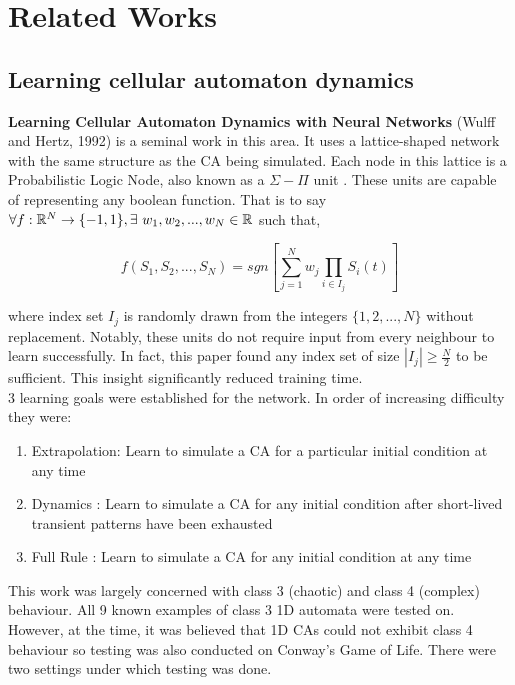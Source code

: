 \chapter{Related Works}

\section{Learning cellular automaton dynamics}

\noindent
\textbf{Learning Cellular Automaton Dynamics with Neural Networks} (Wulff and Hertz, 1992) \cite{wulff1992learning} is a seminal work in this area.
It uses a lattice-shaped network with the same structure as the CA being simulated.
Each node in this lattice is a Probabilistic Logic Node, also known as a $\Sigma-\Pi$ unit \cite{gurney1992training}.
These units are capable of representing any boolean function.
That is to say $ \forall f: \mathbb{R}^N \to \{-1, 1\}, \exists~w_1, w_2, ... , w_N \in \mathbb{R} $ such that,

\begin{equation} \label{eq:sigma_pi}
f(S_1, S_2, ..., S_N) = sgn\left[ \sum_{j=1}^{N} w_j \prod_{i \in I_j} S_i(t) \right]
\end{equation}

\noindent
where index set $I_j$ is randomly drawn from the integers $\{1, 2, ..., N\}$ without replacement.
Notably, these units do not require input from every neighbour to learn successfully.
In fact, this paper found any index set of size $|I_j| \geq \frac{N}{2}$ to be sufficient.
This insight significantly reduced training time. \\ 
3 learning goals were established for the network.
In order of increasing difficulty they were:

\begin{enumerate}
  \item Extrapolation: Learn to simulate a CA for a particular initial condition at any time
  \item Dynamics : Learn to simulate a CA for any initial condition after short-lived transient patterns have been exhausted
  \item Full Rule : Learn to simulate a CA for any initial condition at any time
\end{enumerate}

This work was largely concerned with class 3 (chaotic) and class 4 (complex) behaviour. 
All 9 known examples of class 3 1D automata were tested on.
However, at the time, it was believed that 1D CAs could not exhibit class 4 behaviour so testing was also conducted on Conway's Game of Life.
There were two settings under which testing was done.
 

